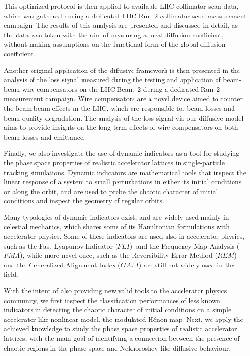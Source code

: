 This optimized protocol is then applied to available LHC collimator scan data, which was gathered during a dedicated LHC Run~2 collimator scan measurement campaign. The results of this analysis are presented and discussed in detail, as the data was taken with the aim of measuring a local diffusion coefficient, without making assumptions on the functional form of the global diffusion coefficient.

Another original application of the diffusive framework is then presented in the analysis of the loss signal measured during the testing and application of beam-beam wire compensators on the LHC Beam~2 during a dedicated Run~2 measurement campaign. Wire compensators are a novel device aimed to counter the beam-beam effects in the LHC, which are responsible for beam losses and beam-quality degradation. The analysis of the loss signal via our diffusive model aims to provide insights on the long-term effects of wire compensators on both beam losses and emittance. 

Finally, we also investigate the use of dynamic indicators as a tool for studying the phase space properties of realistic accelerator lattices in single-particle tracking simulations. Dynamic indicators are mathematical tools that inspect the linear response of a system to small perturbations in either its initial conditions or along the orbit, and are used to probe the chaotic character of initial conditions and inspect the geometry of regular orbits. 

Many typologies of dynamic indicators exist, and are widely used mainly in celestial mechanics, which shares some of its Hamiltonian formulations with accelerator physics. Some of these indicators are used also in accelerator physics, such as the Fast Lyapunov Indicator ($FLI$), and the Frequency Map Analysis ($FMA$), while more novel once, such as the Reversibility Error Method ($REM$) and the Generalized Alignment Index ($GALI$) are still not widely used in the field.

With the intent of also providing new valid tools to the accelerator physics community, we first inspect the classification performances of less known indicators in detecting the chaotic character of initial conditions on a simple accelerator-like nonlinear model, the modulated Hénon map. Next, we apply the achieved knowledge to study the phase space properties of realistic accelerator lattices, with the main goal of identifying a connection between the presence of chaotic regions in the phase space and Nekhoroshev-like diffusive behaviour.

